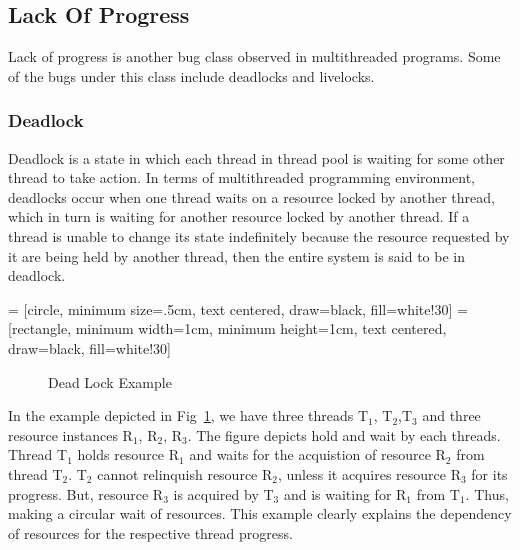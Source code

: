 \subsection{Lack Of Progress}

Lack of progress is another bug class observed in multithreaded programs. 
Some of the bugs under this class include deadlocks and livelocks. 

\subsubsection{Deadlock}

Deadlock is a state in which each thread in thread pool is waiting for some other thread to take action. 
In terms of multithreaded programming environment, deadlocks occur when one thread waits on a resource locked by another thread, which in turn is waiting for another resource locked by another thread. 
If a thread is unable to change its state indefinitely because the resource requested by it are being held by another thread, then the entire system is said to be in deadlock. 

 = [circle, minimum size=.5cm, text centered, draw=black, fill=white!30]
 = [rectangle, minimum width=1cm, minimum height=1cm, text centered, draw=black, fill=white!30]

\begin{figure}[h]
\centering
{}
\caption{Dead Lock Example}
\label{deadlock_example}
\end{figure}

In the example depicted in Fig~\ref{deadlock_example}, we have three threads T$_1$, T$_2$,T$_3$ and three resource instances R$_1$, R$_2$, R$_3$. 
The figure depicts hold and wait by each threads. 
Thread T$_1$ holds resource R$_1$ and waits for the acquistion of resource R$_2$ from thread T$_2$. 
T$_2$ cannot relinquish resource R$_2$, unless it acquires resource R$_3$ for its progress. 
But, resource R$_3$ is acquired by T$_3$ and is waiting for R$_1$ from T$_1$. 
Thus, making a circular wait of resources. 
This example clearly explains the dependency of resources for the respective thread progress. 

